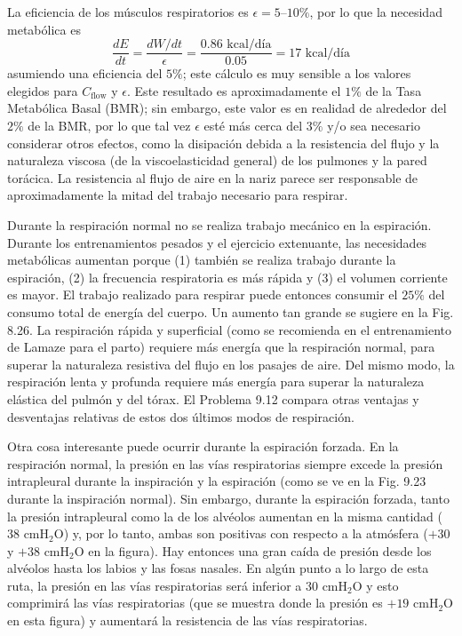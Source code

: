 \documentclass[12pt]{book}
\begin{document}
La eficiencia de los músculos respiratorios es $\epsilon = 5\text{--}10\%$, por lo que la necesidad metabólica es
\begin{equation}
\frac{dE}{dt} = \frac{dW/dt}{\epsilon} = \frac{0.86\text{ kcal/día}}{0.05} = 17\text{ kcal/día} \label{eq:9.20}
\end{equation}
asumiendo una eficiencia del $5\%$; este cálculo es muy sensible a los valores elegidos para $C_{\text{flow}}$ y $\epsilon$. Este resultado es aproximadamente el $1\%$ de la Tasa Metabólica Basal (BMR); sin embargo, este valor es en realidad de alrededor del $2\%$ de la BMR, por lo que tal vez $\epsilon$ esté más cerca del $3\%$ y/o sea necesario considerar otros efectos, como la disipación debida a la resistencia del flujo y la naturaleza viscosa (de la viscoelasticidad general) de los pulmones y la pared torácica. La resistencia al flujo de aire en la nariz parece ser responsable de aproximadamente la mitad del trabajo necesario para respirar.

Durante la respiración normal no se realiza trabajo mecánico en la espiración. Durante los entrenamientos pesados y el ejercicio extenuante, las necesidades metabólicas aumentan porque (1) también se realiza trabajo durante la espiración, (2) la frecuencia respiratoria es más rápida y (3) el volumen corriente es mayor. El trabajo realizado para respirar puede entonces consumir el $25\%$ del consumo total de energía del cuerpo. Un aumento tan grande se sugiere en la Fig. 8.26. La respiración rápida y superficial (como se recomienda en el entrenamiento de Lamaze para el parto) requiere más energía que la respiración normal, para superar la naturaleza resistiva del flujo en los pasajes de aire. Del mismo modo, la respiración lenta y profunda requiere más energía para superar la naturaleza elástica del pulmón y del tórax. El Problema 9.12 compara otras ventajas y desventajas relativas de estos dos últimos modos de respiración.

Otra cosa interesante puede ocurrir durante la espiración forzada. En la respiración normal, la presión en las vías respiratorias siempre excede la presión intrapleural durante la inspiración y la espiración (como se ve en la Fig. 9.23 durante la inspiración normal). Sin embargo, durante la espiración forzada, tanto la presión intrapleural como la de los alvéolos aumentan en la misma cantidad ($38\text{ cmH}_2\text{O}$) y, por lo tanto, ambas son positivas con respecto a la atmósfera ($+30$ y $+38\text{ cmH}_2\text{O}$ en la figura). Hay entonces una gran caída de presión desde los alvéolos hasta los labios y las fosas nasales. En algún punto a lo largo de esta ruta, la presión en las vías respiratorias será inferior a $30\text{ cmH}_2\text{O}$ y esto comprimirá las vías respiratorias (que se muestra donde la presión es $+19\text{ cmH}_2\text{O}$ en esta figura) y aumentará la resistencia de las vías respiratorias.
\end{document}
